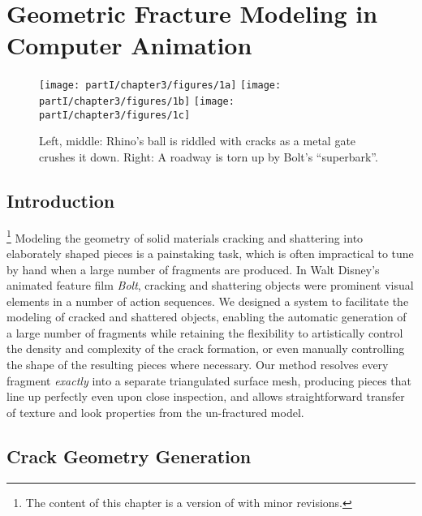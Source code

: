 %

\chapter{Geometric Fracture Modeling in Computer Animation} \label{chap:partI.fractureanimation}

\setlength{\figurewidth}{0.32\textwidth}
\begin{figure}[htbp]
\centering
\texttt{[image: partI/chapter3/figures/1a]}
\texttt{[image: partI/chapter3/figures/1b]}
\texttt{[image: partI/chapter3/figures/1c]}
\caption{Left, middle: Rhino's ball is riddled with cracks as a metal gate crushes it down. Right: A roadway is torn up by Bolt's ``superbark''.}
\label{fig:chap3.1}
\end{figure}

\section{Introduction}

\footnote{The content of this chapter is a version of \cite{Hellrung09} with minor revisions.}
Modeling the geometry of solid materials cracking and shattering
into elaborately shaped pieces is a painstaking task, which is often
impractical to tune by hand when a large number of fragments are
produced. In Walt Disney's animated feature film \textit{Bolt}, cracking
and shattering objects were prominent visual elements in a number
of action sequences. We designed a system to facilitate the modeling
of cracked and shattered objects, enabling the automatic generation
of a large number of fragments while retaining the flexibility to
artistically control the density and complexity of the crack formation,
or even manually controlling the shape of the resulting pieces
where necessary. Our method resolves every fragment \emph{exactly} into
a separate triangulated surface mesh, producing pieces that line up
perfectly even upon close inspection, and allows straightforward
transfer of texture and look properties from the un-fractured model.

\section{Crack Geometry Generation}

